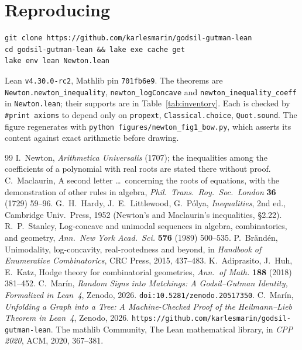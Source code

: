\documentclass[11pt]{article}
\newcommand{\lean}[1]{\texttt{#1}}
\begin{document}
\section*{Reproducing}
\begin{verbatim}
git clone https://github.com/karlesmarin/godsil-gutman-lean
cd godsil-gutman-lean && lake exe cache get
lake env lean Newton.lean
\end{verbatim}
Lean \lean{v4.30.0-rc2}, Mathlib pin \lean{701fb6e9}. The theorems are
\lean{Newton.newton\_inequality}, \lean{newton\_logConcave} and \lean{newton\_inequality\_coeff} in
\lean{Newton.lean}; their supports are in Table~\ref{tab:inventory}. Each is checked by
\lean{\#print axioms} to depend only on \lean{propext}, \lean{Classical.choice}, \lean{Quot.sound}.
The figure regenerates with \lean{python figures/newton\_fig1\_bow.py}, which asserts its content
against exact arithmetic before drawing.

\begin{thebibliography}{99}\small
{} I.~Newton, \emph{Arithmetica Universalis} (1707); the inequalities among the
coefficients of a polynomial with real roots are stated there without proof.
 C.~Maclaurin, A second letter \dots\ concerning the roots of equations,
with the demonstration of other rules in algebra, \emph{Phil.\ Trans.\ Roy.\ Soc.\ London}
\textbf{36} (1729) 59--96.
 G.~H.~Hardy, J.~E.~Littlewood, G.~P\'olya, \emph{Inequalities}, 2nd ed., Cambridge
Univ.\ Press, 1952 (Newton's and Maclaurin's inequalities, \S2.22).
 R.~P.~Stanley, Log-concave and unimodal sequences in algebra,
combinatorics, and geometry, \emph{Ann.\ New York Acad.\ Sci.} \textbf{576} (1989) 500--535.
 P.~Br\"and\'en, Unimodality, log-concavity, real-rootedness and beyond, in
\emph{Handbook of Enumerative Combinatorics}, CRC Press, 2015, 437--483.
 K.~Adiprasito, J.~Huh, E.~Katz, Hodge theory for combinatorial geometries,
\emph{Ann.\ of Math.} \textbf{188} (2018) 381--452.
 C.~Mar\'in, \emph{Random Signs into Matchings: A Godsil--Gutman Identity,
Formalized in Lean~4}, Zenodo, 2026. \texttt{doi:10.5281/zenodo.20517350}.
 C.~Mar\'in, \emph{Unfolding a Graph into a Tree: A Machine-Checked Proof of the
Heilmann--Lieb Theorem in Lean~4}, Zenodo, 2026.
\texttt{https://github.com/karlesmarin/godsil-gutman-lean}.
 The mathlib Community, The Lean mathematical library, in \emph{CPP 2020},
ACM, 2020, 367--381.
\end{thebibliography}
\end{document}
